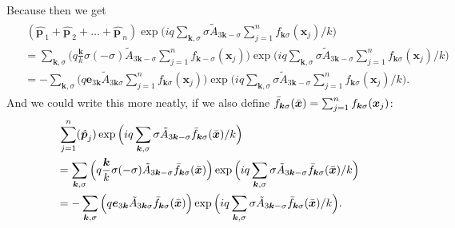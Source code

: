 \documentclass{report}
\begin{document}
Because then we get
\begin{align}
\begin{aligned}
	&\,({\hat{\boldsymbol p\,}\!}_1 + {\hat{\boldsymbol p\,}\!}_2 + \ldots + {\hat{\boldsymbol p\,}\!}_n)
	\exp\Big(
		i q \sum_{\boldsymbol{k}, \sigma} \sigma \tilde A_{3\boldsymbol{k}-\sigma} 
		\sum_{j=1}^n f_{\boldsymbol{k}\sigma}(\boldsymbol{x}_j) / k
	\Big) \\
	&= \sum_{\boldsymbol{k}, \sigma} \Big(
		q\frac{\boldsymbol{k}}{k}\sigma (-\sigma)
		\tilde A_{3\boldsymbol{k} -\sigma} 
		\sum_{j=1}^n f_{\boldsymbol{k} -\sigma}(\boldsymbol{x}_j)
	\Big)
	\exp\Big(
			i q \sum_{\boldsymbol{k}, \sigma} \sigma \tilde A_{3\boldsymbol{k}-\sigma} 
			\sum_{j=1}^n f_{\boldsymbol{k}\sigma}(\boldsymbol{x}_j) / k
		\Big)
	\\
	&=-\sum_{\boldsymbol{k}, \sigma} \Big(
		q \boldsymbol{e}_{3\boldsymbol{k}}
		\tilde A_{3\boldsymbol{k} \sigma} 
		\sum_{j=1}^n f_{\boldsymbol{k} \sigma}(\boldsymbol{x}_j)
	\Big)
	\exp\Big(
			i q \sum_{\boldsymbol{k}, \sigma} \sigma \tilde A_{3\boldsymbol{k}-\sigma} 
			\sum_{j=1}^n f_{\boldsymbol{k}\sigma}(\boldsymbol{x}_j) / k
		\Big).
\end{aligned}
\end{align}
And we could write this more neatly, if we also define 
$\bar f_{\boldsymbol{k} \sigma}(\bar{\boldsymbol{x}\hspace{.05em}}\hspace{-.05em}) = 
\sum_{j=1}^n f_{\boldsymbol{k} \sigma}(\boldsymbol{x}_j)$:
\begin{align}
\begin{aligned}
	&\, \sum_{j=1}^n ({\hat{\boldsymbol p\,}\!}_j)
	\exp\Big(
		i q \sum_{\boldsymbol{k}, \sigma} \sigma \tilde A_{3\boldsymbol{k}-\sigma} 
		\bar f_{\boldsymbol{k} \sigma}(\bar{\boldsymbol{x}\hspace{.05em}}\hspace{-.05em}) / k
	\Big) \\
	&= \sum_{\boldsymbol{k}, \sigma} \Big(
		q\frac{\boldsymbol{k}}{k}\sigma (-\sigma)
		\tilde A_{3\boldsymbol{k} -\sigma} 
		\bar f_{\boldsymbol{k} \sigma}(\bar{\boldsymbol{x}\hspace{.05em}}\hspace{-.05em})
	\Big)
	\exp\Big(
			i q \sum_{\boldsymbol{k}, \sigma} \sigma \tilde A_{3\boldsymbol{k}-\sigma} 
			\bar f_{\boldsymbol{k} \sigma}(\bar{\boldsymbol{x}\hspace{.05em}}\hspace{-.05em}) / k
		\Big)
	\\
	&=-\sum_{\boldsymbol{k}, \sigma} \Big(
		q \boldsymbol{e}_{3\boldsymbol{k}}
		\tilde A_{3\boldsymbol{k} \sigma} 
		\bar f_{\boldsymbol{k} \sigma}(\bar{\boldsymbol{x}\hspace{.05em}}\hspace{-.05em})
	\Big)
	\exp\Big(
			i q \sum_{\boldsymbol{k}, \sigma} \sigma \tilde A_{3\boldsymbol{k}-\sigma} 
			\bar f_{\boldsymbol{k} \sigma}(\bar{\boldsymbol{x}\hspace{.05em}}\hspace{-.05em}) / k
		\Big).
\end{aligned}
\end{align}
\end{document}
